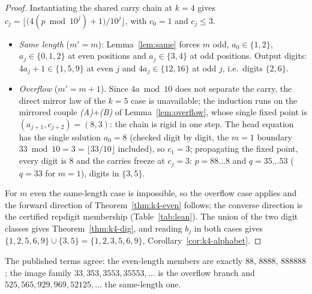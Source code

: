 \begin{proof}
Instantiating the shared carry chain at $k = 4$ gives
$c_j = \bigl\lfloor\bigl(4(p \bmod 10^j) +
1\bigr)/10^j\bigr\rfloor$, with $c_0 = 1$ and
$c_j \le 3$.
\begin{itemize}
\item \emph{Same length} ($m' = m$):
Lemma~\ref{lem:same} forces $m$ odd,
$a_0 \in \{1,2\}$, $a_j \in \{0,1,2\}$ at even positions
and $a_j \in \{3,4\}$ at odd positions. Output digits:
$4a_j + 1 \in \{1,5,9\}$ at even $j$ and
$4a_j \in \{12,16\}$ at odd $j$, i.e.\ digits
$\{2,6\}$.
\item \emph{Overflow} ($m' = m+1$). Since
$4a \bmod 10$ does not separate the carry, the direct
mirror law of the $k = 5$ case is unavailable; the
induction runs on the mirrored couple \emph{(A)}+\emph{(B)}
of Lemma~\ref{lem:overflow}, whose single fixed point is
$(a_{j+1}, c_{j+2}) = (8, 3)$: the chain is rigid in one
step. The head equation has the single solution
$a_0 = 8$ (checked digit by digit, the $m = 1$ boundary
$33 \bmod 10 = 3 = \lfloor 33/10 \rfloor$ included), so
$c_1 = 3$; propagating the fixed point, every digit is
$8$ and the carries freeze at $c_j = 3$:
$p = 88\ldots8$ and $q = 35\ldots53$ ($q = 33$ for
$m = 1$), digits in $\{3,5\}$.
\end{itemize}
For $m$ even the same-length case is impossible, so the
overflow case applies and the forward direction of
Theorem~\ref{thm:k4-even} follows; the converse
direction is the certified repdigit membership
(Table~\ref{tab:lean}). The union of the two digit
classes gives Theorem~\ref{thm:k4-dig}, and reading
$b_j$ in both cases gives
$\{1,2,5,6,9\} \cup \{3,5\} = \{1,2,3,5,6,9\}$,
Corollary~\ref{cor:k4-alphabet}.
\end{proof}

The published terms agree: the even-length members are
exactly $88$, $8888$, $888888$; the image family
$33, 353, 3553, 35553, \ldots$ is the overflow branch
and $525, 565, 929, 969, 52125, \ldots$ the same-length
one.
